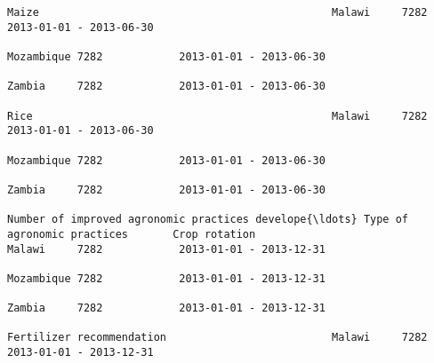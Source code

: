 \documentclass[11pt]{article}
\begin{document}
\begin{Verbatim}[commandchars=\\\{\}]
                                                                                                                                                              Maize                                              Malawi     7282            2013-01-01 - 2013-06-30   
                                                                                                                                                                                                                 Mozambique 7282            2013-01-01 - 2013-06-30   
                                                                                                                                                                                                                 Zambia     7282            2013-01-01 - 2013-06-30   
                                                                                                                                                              Rice                                               Malawi     7282            2013-01-01 - 2013-06-30   
                                                                                                                                                                                                                 Mozambique 7282            2013-01-01 - 2013-06-30   
                                                                                                                                                                                                                 Zambia     7282            2013-01-01 - 2013-06-30   
                                                                         Number of improved agronomic practices develope{\ldots} Type of agronomic practices       Crop rotation                                      Malawi     7282            2013-01-01 - 2013-12-31   
                                                                                                                                                                                                                 Mozambique 7282            2013-01-01 - 2013-12-31   
                                                                                                                                                                                                                 Zambia     7282            2013-01-01 - 2013-12-31   
                                                                                                                                                              Fertilizer recommendation                          Malawi     7282            2013-01-01 - 2013-12-31   

\end{Verbatim}
\end{document}

